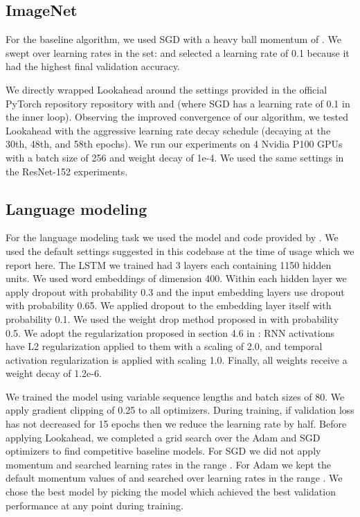 \documentclass{article}
\begin{document}
\subsection{ImageNet}
For the baseline algorithm, we used SGD with a heavy ball momentum of . We swept over learning rates in the set:  and selected a learning rate of 0.1 because it had the highest final validation accuracy.

We directly wrapped Lookahead around the settings provided in the official PyTorch repository repository with  and  (where SGD has a learning rate of 0.1 in the inner loop). Observing the improved convergence of our algorithm, we tested Lookahead with the aggressive learning rate decay schedule (decaying at the 30th, 48th, and 58th epochs). We run our experiments on 4 Nvidia P100 GPUs with a batch size of 256 and weight decay of 1e-4. We used the same settings in the ResNet-152 experiments. 

\subsection{Language modeling}

For the language modeling task we used the model and code provided by \citet{merity2017regularizing}. We used the default settings suggested in this codebase at the time of usage which we report here. The LSTM we trained had 3 layers each containing 1150 hidden units. We used word embeddings of dimension 400.  Within each hidden layer we apply dropout with probability 0.3 and the input embedding layers use dropout with probability 0.65. We applied dropout to the embedding layer itself with probability 0.1. We used the weight drop method proposed in \citet{merity2017regularizing} with probability 0.5. We adopt the regularization proposed in section 4.6 in \citet{merity2017regularizing}: RNN activations have L2 regularization applied to them with a scaling of 2.0, and temporal activation regularization is applied with scaling 1.0. Finally, all weights receive a weight decay of 1.2e-6.

We trained the model using variable sequence lengths and batch sizes of 80. We apply gradient clipping of 0.25 to all optimizers. During training, if validation loss has not decreased for 15 epochs then we reduce the learning rate by half.  Before applying Lookahead, we completed a grid search over the Adam and SGD optimizers to find competitive baseline models. For SGD we did not apply momentum and searched learning rates in the range . For Adam we kept the default momentum values of  and searched over learning rates in the range . We chose the best model by picking the model which achieved the best validation performance at any point during training.
\end{document}
